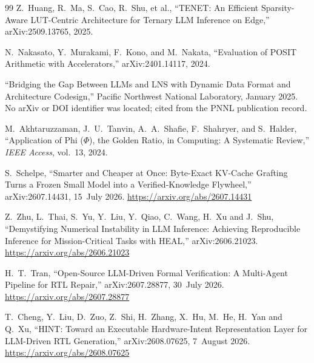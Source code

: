 \begin{thebibliography}{99}
 Z.~Huang, R.~Ma, S.~Cao, R.~Shu, et al., ``TENET: An
Efficient Sparsity-Aware LUT-Centric Architecture for Ternary LLM Inference on
Edge,'' arXiv:2509.13765, 2025.

 N.~Nakasato, Y.~Murakami, F.~Kono, and M.~Nakata,
``Evaluation of POSIT Arithmetic with Accelerators,'' arXiv:2401.14117, 2024.

 ``Bridging the Gap Between LLMs and LNS with Dynamic Data
Format and Architecture Codesign,'' Pacific Northwest National Laboratory,
January 2025. No arXiv or DOI identifier was located; cited from the PNNL
publication record.

 M.~Akhtaruzzaman, J.~U.~Tanvin, A.~A.~Shafie,
F.~Shahryer, and S.~Halder, ``Application of Phi ($\Phi$), the Golden Ratio, in
Computing: A Systematic Review,'' \emph{IEEE Access}, vol.~13, 2024.

 S.~Schelpe, ``Smarter and Cheaper at Once: Byte-Exact KV-Cache Grafting Turns a Frozen Small Model into a Verified-Knowledge Flywheel,'' arXiv:2607.14431, 15~July 2026. \url{https://arxiv.org/abs/2607.14431}

 Z.~Zhu, L.~Thai, S.~Yu, Y.~Liu, Y.~Qiao, C.~Wang, H.~Xu and J.~Shu, ``Demystifying Numerical Instability in LLM Inference: Achieving Reproducible Inference for Mission-Critical Tasks with HEAL,'' arXiv:2606.21023. \url{https://arxiv.org/abs/2606.21023}

 H.~T.~Tran, ``Open-Source LLM-Driven Formal Verification: A Multi-Agent Pipeline for RTL Repair,'' arXiv:2607.28877, 30~July 2026. \url{https://arxiv.org/abs/2607.28877}

 T.~Cheng, Y.~Liu, D.~Zuo, Z.~Shi, H.~Zhang, X.~Hu,
M.~He, H.~Yan and Q.~Xu, ``HINT: Toward an Executable Hardware-Intent
Representation Layer for LLM-Driven RTL Generation,'' arXiv:2608.07625, 7~August
2026. \url{https://arxiv.org/abs/2608.07625}

\end{thebibliography}
